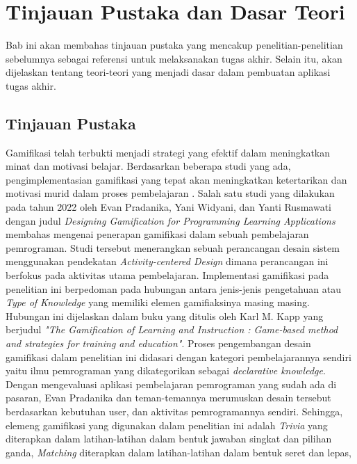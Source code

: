 \chapter{Tinjauan Pustaka dan Dasar Teori}
Bab ini akan membahas tinjauan pustaka yang mencakup penelitian-penelitian sebelumnya sebagai referensi untuk melaksanakan tugas akhir. Selain itu, akan dijelaskan tentang teori-teori yang menjadi dasar dalam pembuatan aplikasi tugas akhir.
\section{Tinjauan Pustaka}
Gamifikasi telah terbukti menjadi strategi yang efektif dalam meningkatkan minat dan motivasi belajar. 
Berdasarkan beberapa studi yang ada, pengimplementasian gamifikasi yang tepat akan meningkatkan ketertarikan dan motivasi murid dalam proses pembelajaran \cite{EnjoyLearningLikeGaming}.
Salah satu studi yang dilakukan pada tahun 2022 oleh Evan Pradanika, Yani Widyani, dan Yanti Rusmawati dengan judul \textit{Designing Gamification for Programming Learning Applications } \cite{GamificationInProgLang} membahas mengenai penerapan gamifikasi
dalam sebuah pembelajaran pemrograman. Studi tersebut menerangkan sebuah perancangan desain sistem menggunakan pendekatan \textit{Activity-centered Design} dimana perancangan ini berfokus pada aktivitas utama pembelajaran\cite{GamificationInProgLang}. 
Implementasi gamifikasi pada penelitian ini berpedoman pada hubungan antara jenis-jenis pengetahuan atau \textit{Type of Knowledge} yang memiliki elemen gamifiaksinya masing masing.
Hubungan ini dijelaskan dalam buku yang ditulis oleh Karl M. Kapp yang berjudul \textit{"The Gamification of Learning and Instruction : Game-based method and strategies for training and education"}\cite{kapp2012gamification}.
Proses pengembangan desain gamifikasi dalam penelitian ini didasari dengan kategori pembelajarannya sendiri yaitu ilmu pemrograman yang dikategorikan sebagai \textit{declarative knowledge}.
Dengan mengevaluasi aplikasi pembelajaran pemrograman yang sudah ada di pasaran, Evan Pradanika dan teman-temannya merumuskan desain tersebut berdasarkan kebutuhan user, dan aktivitas pemrogramannya sendiri.
Sehingga, elemeng gamifikasi yang digunakan dalam penelitian ini adalah
\textit{Trivia} yang diterapkan dalam latihan-latihan dalam bentuk jawaban singkat dan pilihan ganda,
\textit{Matching} diterapkan dalam latihan-latihan dalam bentuk seret dan lepas,
